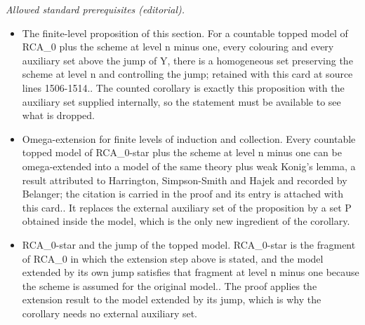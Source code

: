 \documentclass{article}
\numberwithin{theorem}{section}
\newtheorem{proposition}[theorem]{Proposition}
\newtheorem{corollary}[theorem]{Corollary}
\newcommand{\RCA}{\mathsf{RCA}}
\newcommand{\BSig}{\mathsf{B}\Sigma^0}
\newcommand{\ISig}{\mathsf{I}\Sigma^0}
\newcommand{\M}{\mathcal{M}}
\begin{document}
\noindent\textit{Allowed standard prerequisites (editorial).}\begin{itemize}
\item The finite-level proposition of this section. For a countable topped model of RCA\_0 plus the scheme at level n minus one, every colouring and every auxiliary set above the jump of Y, there is a homogeneous set preserving the scheme at level n and controlling the jump; retained with this card at source lines 1506-1514.. The counted corollary is exactly this proposition with the auxiliary set supplied internally, so the statement must be available to see what is dropped.
\item Omega-extension for finite levels of induction and collection. Every countable topped model of RCA\_0-star plus the scheme at level n minus one can be omega-extended into a model of the same theory plus weak Konig's lemma, a result attributed to Harrington, Simpson-Smith and Hajek and recorded by Belanger; the citation is carried in the proof and its entry is attached with this card.. It replaces the external auxiliary set of the proposition by a set P obtained inside the model, which is the only new ingredient of the corollary.
\item RCA\_0-star and the jump of the topped model. RCA\_0-star is the fragment of RCA\_0 in which the extension step above is stated, and the model extended by its own jump satisfies that fragment at level n minus one because the scheme is assumed for the original model.. The proof applies the extension result to the model extended by its jump, which is why the corollary needs no external auxiliary set.
\end{itemize}\medskip
{}

\end{document}
